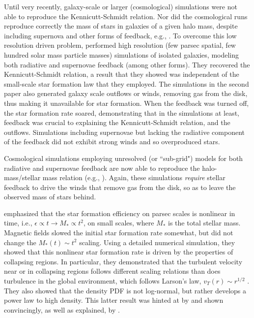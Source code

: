 \documentclass[../dissertation.tex]{subfiles}
\begin{document}
Until very recently, galaxy-scale or larger (cosmological) simulations 
were not able to reproduce the Kennicutt-Schmidt relation.  Nor 
did the cosmological runs reproduce correctly the mass of stars in galaxies of a given 
halo mass, despite including supernova and other forms of feedback, 
e.g., \citet{2010MNRAS.404.1111G,2010Natur.463..203G,2011MNRAS.410.2625P}.
To overcome this low resolution driven problem, \citet{2011MNRAS.417..950H,2012MNRAS.421.3522H}
performed high resolution (few parsec spatial, few hundred solar mass particle masses) simulations 
of isolated galaxies, modeling both radiative and supernovae feedback (among other forms). 
They recovered the Kennicutt-Schmidt relation, a result that they 
showed was independent of the small-scale star formation
law that they employed. The simulations in the second paper also generated galaxy 
scale outflows or winds, removing gas from the disk, thus making it unavailable for star 
formation. When the feedback was turned off, the star formation rate soared, demonstrating that
in the simulations at least, feedback was crucial to explaining the Kennicutt-Schmidt relation, and
the outflows. Simulations including supernovae but lacking the radiative component of the feedback
did not exhibit strong winds and so overproduced stars.

Cosmological simulations employing unresolved (or ``sub-grid") models for both 
radiative and supernovae feedback are now able to reproduce the halo-mass/stellar mass relation (e.g.,
\citealt{2013MNRAS.434.3142A,2014MNRAS.445..581H,2015ApJ...804...18A}). Again, 
these simulations {\em require} 
stellar feedback to drive the winds that remove gas from the disk, so as to 
leave the observed mass of stars behind. 

\citet{2015ApJ...800...49L} emphasized that the star formation efficiency on 
parsec scales is nonlinear 
in time, i.e., $\epsilon \propto t \rightarrow M_* \propto t^2$, on small scales, where $M_*$ is the total stellar mass. Magnetic fields slowed the initial star
formation rate somewhat, but did not change the $M_*(t)\sim t^2$ scaling. 
Using a detailed numerical simulation, they showed that this nonlinear star formation 
rate is driven by the properties of collapsing regions.
In particular, they demonstrated that the turbulent velocity near or in
collapsing regions follows 
different scaling relations than does turbulence in the global environment, which follows
Larson's law, $v_T(r)\sim r^{1/2}$ \citep{1981MNRAS.194..809L}. They also showed that the density PDF 
is not log-normal, but rather develops a power law to high density.
This latter result was hinted at by \citet{2000ApJ...535..869K} and shown convincingly, 
as well as explained, by \citet{2011ApJ...727L..20K}. 
\end{document}
